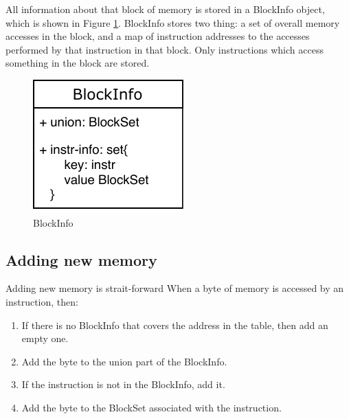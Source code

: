\documentclass[12pt,twoside]{reedthesis}
\begin{document}
			All information about that block of memory is stored in a BlockInfo object, which is shown in Figure \ref{fig:block-data}. BlockInfo stores two thing: a set of overall memory accesses in the block, and a map of instruction addresses to the accesses performed by that instruction in that block. Only instructions which access something in the block are stored.

		
			\begin{figure}[h]
				\caption{BlockInfo}
				\label{fig:block-data}
				\includegraphics[scale=1.0]{block-info.pdf}
			\end{figure}
%						
%			
			
			\subsection{Adding new memory}
			
			Adding new memory is strait-forward
			When a byte of memory is accessed by an instruction, then:
			
			\begin{enumerate}
				\item If there is no BlockInfo that covers the address in the table, then add an empty one.
				\item Add the byte to the union part of the BlockInfo.
				\item If the instruction is not in the BlockInfo, add it.
				\item Add the byte to the BlockSet associated with the instruction.
			\end{enumerate}
			
\end{document}
